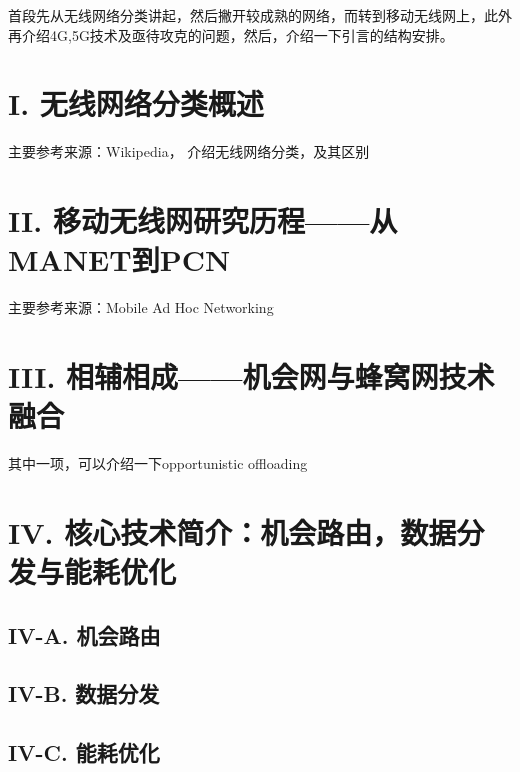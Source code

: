\begin{introduction}

首段先从无线网络分类讲起，然后撇开较成熟的网络，而转到移动无线网上，此外再介绍4G,5G技术及亟待攻克的问题，然后，介绍一下引言的结构安排。


\section*{I. 无线网络分类概述}
主要参考来源：Wikipedia， 介绍无线网络分类，及其区别

\section*{II. 移动无线网研究历程——从MANET到PCN}
主要参考来源：Mobile Ad Hoc Networking \cite{Conti:2014gg}

\section*{III. 相辅相成——机会网与蜂窝网技术融合}
其中一项，可以介绍一下opportunistic offloading

\section*{IV. 核心技术简介：机会路由，数据分发与能耗优化}

\subsection*{IV-A. 机会路由}

\subsection*{IV-B. 数据分发}

\subsection*{IV-C. 能耗优化}


\end{introduction}
